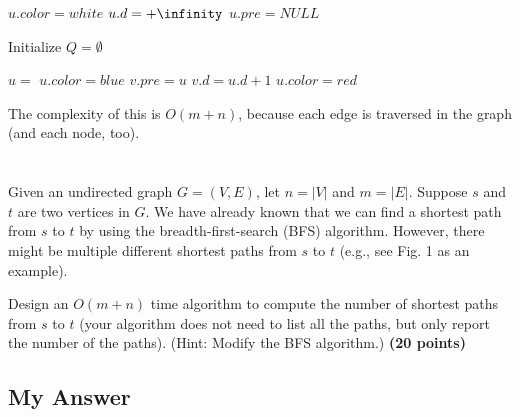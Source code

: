\documentclass{article}
\begin{document}
{\singlespacing
\begin{algorithmic}
      \State $u.color  = white$
      \State $u.d = +\infinity$
      \State $u.pre = NULL$
    \EndFor
    
    \State Initialize $Q = \emptyset$
      
      \State {}
        \State $u = $ 
          \State $u.color = blue$
              \State {}
              \State $v.pre = u$
              \State $v.d = u.d + 1$
            \EndIf
          \EndFor
            \State {}
            \State {}
            \State $u.color = red$            
        \Else{}
            \State {}
        
        \EndIf
      \EndWhile
    \EndIf
    \EndFor
\EndFunction    
\end{algorithmic}
}
The complexity of this is $O(m+n)$, because each edge is traversed in
the graph (and each node, too).





\section{} %
Given an undirected graph $G = (V, E)$, let $n = |V|$ and $m
=|E|$. Suppose $s$ and $t$ are two vertices in $G$. We have already
known that we can find a shortest path from $s$ to $t$ by using the 
breadth-first-search (BFS) algorithm. However, there might be multiple  
different shortest paths from $s$ to $t$ (e.g., see Fig. 1 as an
example). 

Design an $O(m + n)$ time algorithm to compute the number of shortest
paths from $s$ to $t$ (your algorithm does not need to list all the
paths, but only report the number of the paths). (Hint: Modify the BFS 
algorithm.) {\bf (20 points) }

\subsection{My Answer}
\end{document}
